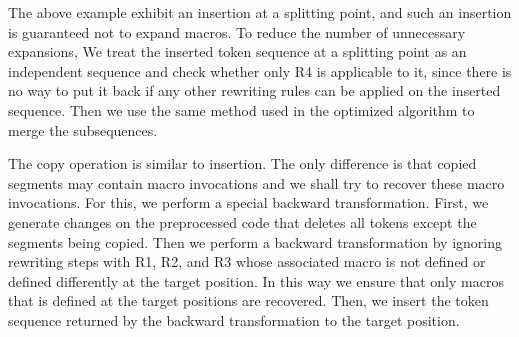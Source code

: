 The above example exhibit an insertion at a splitting point, and such
an insertion is guaranteed not to expand
macros. To reduce the number of unnecessary expansions, %
We treat the
inserted token sequence at a splitting point as an independent sequence and check
whether only R4 is applicable to it, since there is no way to put it
back if any other rewriting rules can be applied on the inserted
sequence. Then we use the same method used in the optimized algorithm
to merge the subsequences.

The copy operation is similar to insertion. The only difference is
that copied segments may contain macro invocations and we shall
try to recover these macro invocations. For this, we perform a
special backward transformation. First, we generate changes on the
preprocessed code that deletes all tokens except the segments being
copied. Then we perform a backward transformation by ignoring
rewriting steps with R1, R2, and R3 whose associated macro is not
defined or defined differently at the target position. In this way we
ensure that only macros that is defined at the target positions are recovered.
Then, we insert the token sequence returned by the backward
transformation to the target position.




